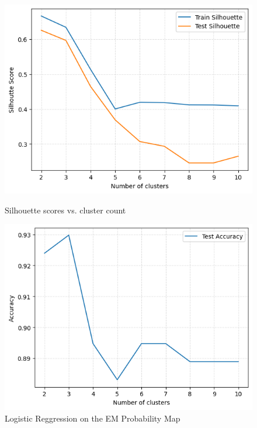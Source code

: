 \documentclass[11pt]{article}
\begin{document}
\begin{figure}[H]
  \centering
  \begin{minipage}{0.48\textwidth}
    \includegraphics[width=\linewidth]{img/Silhouettes.png}
    \caption{Silhouette scores vs. cluster count}
    \label{fig:silhouette-score}
  \end{minipage}
  \hfill
  \begin{minipage}{0.48\textwidth}
    \includegraphics[width=\linewidth]{img/EMProbMapAccuracy.png}
    \caption{Logistic Reggression on the EM Probability Map}
    \label{fig:em-accuracy}
  \end{minipage}
\end{figure}
\end{document}
